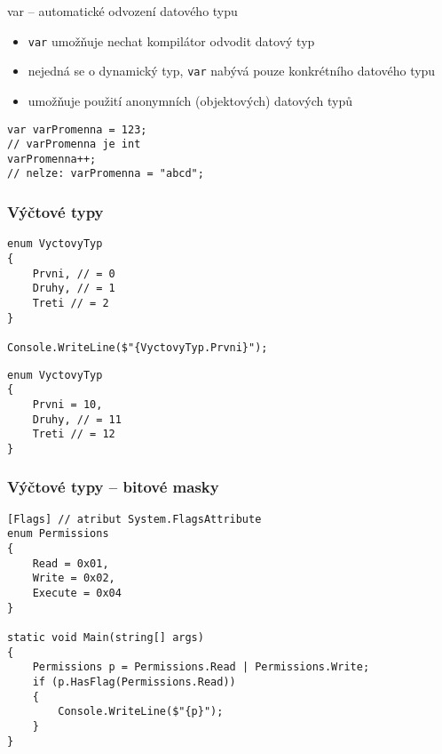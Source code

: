 \begin{frame}[fragile]
\begin{block}{var -- automatické odvození datového typu}
\begin{itemize}
\item \lstinline|var| umožňuje nechat kompilátor odvodit datový typ
\item nejedná se o dynamický typ, \lstinline|var| nabývá pouze konkrétního datového typu
\item umožňuje použití anonymních (objektových) datových typů 
\end{itemize}
\end{block}
\begin{yesblock}
\begin{lstlisting}
var varPromenna = 123;
// varPromenna je int
varPromenna++;
// nelze: varPromenna = "abcd";
\end{lstlisting}
\end{yesblock}
\end{frame}


\begin{frame}[fragile]
\frametitle{Výčtové typy}
\begin{yesblock}
\begin{lstlisting}
enum VyctovyTyp
{
    Prvni, // = 0
    Druhy, // = 1
    Treti // = 2
}

Console.WriteLine($"{VyctovyTyp.Prvni}");
\end{lstlisting}
\end{yesblock}
\vskip -3mm
\begin{yesblock}
\begin{lstlisting}
enum VyctovyTyp
{
    Prvni = 10,
    Druhy, // = 11
    Treti // = 12
}
\end{lstlisting}
\end{yesblock}
\end{frame}


\begin{frame}[fragile]
\frametitle{Výčtové typy -- bitové masky}
\begin{bonusblock}{}
\begin{lstlisting}
[Flags] // atribut System.FlagsAttribute
enum Permissions
{
    Read = 0x01,
    Write = 0x02,
    Execute = 0x04
}

static void Main(string[] args)
{
    Permissions p = Permissions.Read | Permissions.Write;
    if (p.HasFlag(Permissions.Read))
    {
        Console.WriteLine($"{p}");
    }
}
\end{lstlisting}
\end{bonusblock}
\end{frame}


